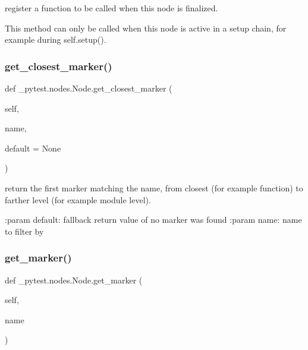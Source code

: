 \begin{DoxyVerb}register a function to be called when this node is finalized.

This method can only be called when this node is active
in a setup chain, for example during self.setup().
\end{DoxyVerb}
 \mbox{\label{class__pytest_1_1nodes_1_1_node_ae23b659185aada70e62911d02763decc}} 
\subsubsection{\texorpdfstring{get\+\_\+closest\+\_\+marker()}{get\_closest\_marker()}}
{\footnotesize\ttfamily def \+\_\+pytest.\+nodes.\+Node.\+get\+\_\+closest\+\_\+marker (\begin{DoxyParamCaption}\item[{}]{self,  }\item[{}]{name,  }\item[{}]{default = {\ttfamily None} }\end{DoxyParamCaption})}

\begin{DoxyVerb}return the first marker matching the name, from closest (for example function) to farther level (for example
module level).

:param default: fallback return value of no marker was found
:param name: name to filter by
\end{DoxyVerb}
 \mbox{\label{class__pytest_1_1nodes_1_1_node_ae2b2c85b2d9fabc5f96c1b992774e5c9}} 
\subsubsection{\texorpdfstring{get\+\_\+marker()}{get\_marker()}}
{\footnotesize\ttfamily def \+\_\+pytest.\+nodes.\+Node.\+get\+\_\+marker (\begin{DoxyParamCaption}\item[{}]{self,  }\item[{}]{name }\end{DoxyParamCaption})}

